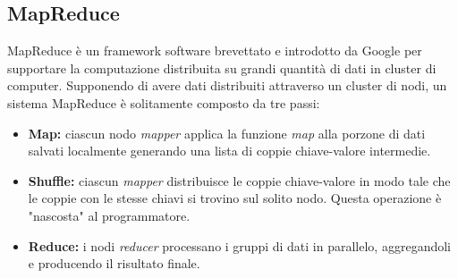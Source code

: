 \documentclass{article}
\begin{document}
\begin{appendices}

\newpage
\section{MapReduce}
MapReduce è un framework software brevettato e introdotto da Google per supportare la computazione distribuita su grandi quantità di dati in cluster di computer. Supponendo di avere dati distribuiti attraverso un cluster di nodi, un sistema MapReduce è solitamente composto da tre passi:
\begin{itemize}
    \item \textbf{Map:} ciascun nodo \textit{mapper} applica la funzione \textit{map} alla porzone di dati salvati localmente generando una lista di coppie chiave-valore intermedie.
    \item \textbf{Shuffle:} ciascun \textit{mapper} distribuisce le coppie chiave-valore in modo tale che le coppie con le stesse chiavi si trovino sul solito nodo. Questa operazione è "nascosta" al programmatore.
    \item \textbf{Reduce:} i nodi \textit{reducer} processano i gruppi di dati in parallelo, aggregandoli e producendo il risultato finale.
\end{itemize}


\end{appendices}
\end{document}
